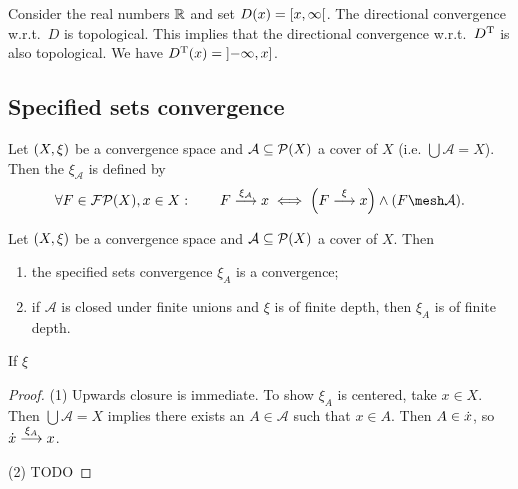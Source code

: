 \begin{example}
Consider the real numbers $\mathbb{R}$ and set $D(x) = \interval[co]{x,\infty}$. The directional convergence w.r.t.\ $D$ is topological. This implies that the directional convergence w.r.t.\ $D^{\mathrm{T}}$ is also topological. We have $D^\transp(x) = \interval[oc]{-\infty, x}$.
\end{example}

\subsection{Specified sets convergence}
\begin{definition}
Let $\left( X,\xi \right)$ be a convergence space and $\mathcal{A}\subseteq \operatorname{\mathcal{P}}(X)$ a cover of $X$ (i.e. $\bigcup \mathcal{A} = X$). Then the  $\xi_{\mathcal{A}}$ is defined by
\[ \forall F\in\powerfilters(X), x\in X: \qquad F\overset{\xi_{\mathcal{A}}}{\longrightarrow} x \iff \Big(F \overset{\xi}{\longrightarrow} x\Big) \land (F \mesh \mathcal{A}). \]
\end{definition}

\begin{lemma}
Let $\left( X,\xi \right)$ be a convergence space and $\mathcal{A}\subseteq \operatorname{\mathcal{P}}(X)$ a cover of $X$. Then
\begin{enumerate}
\item the specified sets convergence $\xi_A$ is a convergence;
\item if $\mathcal{A}$ is closed under finite unions and $\xi$ is of finite depth, then $\xi_A$ is of finite depth.
\end{enumerate}


If $\xi $
\end{lemma}
\begin{proof}
(1) Upwards closure is immediate. To show $\xi_A$ is centered, take $x\in X$. Then $\bigcup \mathcal{A} = X$ implies there exists an $A\in \mathcal{A}$ such that $x\in A$. Then $A\in \dot{x}$, so $\dot{x} \overset{\xi_A}{\longrightarrow} x$.

(2) TODO
\end{proof}



